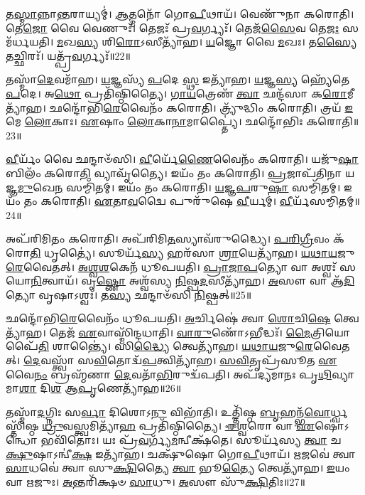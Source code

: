 𑌤\-\ul{𑌸𑍍𑌮𑌾}\-𑌨𑍍𑌨𑌾\-\ul{𑌨𑍍𑌤}\-𑌰𑌾𑌯𑍍𑌯𑌮𑍍॑। 
\-\ul{𑌆}\-𑌤𑍍𑌮𑌨𑍋᳴ 𑌗𑍋\-\ul{𑌪𑍀}\-𑌥𑌾𑌯᳴। 
𑌵𑍇𑌣𑍁᳴𑌨𑌾 𑌕𑌰𑍋𑌤𑌿। 
𑌤𑍇\-\ul{𑌜𑍋} 𑌵𑍈 𑌵𑍇𑌣𑍁𑌃᳴। 
𑌤𑍇𑌜𑌃᳴ 𑌪𑍍𑌰\-\ul{𑌵}\-𑌰𑍍𑌗𑍍𑌯𑌃᳴। 
𑌤𑍇𑌜᳴\-\ul{𑌸𑍈}\-𑌵 𑌤𑍇\-\ul{𑌜𑌃} 𑌸𑌮᳴𑌰𑍍𑌧𑌯𑌤𑌿। 
\-\ul{𑌮}\-𑌖\-\ul{𑌸𑍍𑌯} 𑌶𑌿\-\ul{𑌰𑍋}\-𑌽𑌸𑍀𑌤𑍍𑌯𑌾᳴𑌹। 
\-\ul{𑌯}\-𑌜𑍍𑌞𑍋 𑌵𑍈 \ul{𑌮}\-𑌖𑌃। 
𑌤\-\ul{𑌸𑍍𑌯𑍈}\-𑌤𑌚𑍍𑌛𑌿𑌰𑌃᳴। 
𑌯𑌤𑍍𑌪𑍍𑌰᳴\-\ul{𑌵}\-𑌰𑍍𑌗𑍍𑌯𑌃᳴॥22॥

𑌤𑌸𑍍𑌮𑌾᳴\-\ul{𑌦𑍇}\-𑌵𑌮𑌾᳴𑌹। 
\-\ul{𑌯}\-𑌜𑍍𑌞𑌸𑍍𑌯᳴ \ul{𑌪}\-𑌦𑍇 \ul{𑌸𑍍𑌥} 𑌇𑌤𑍍𑌯𑌾᳴𑌹। 
\-\ul{𑌯}\-𑌜𑍍𑌞\-\ul{𑌸𑍍𑌯} 𑌹𑍍𑌯𑍇᳴𑌤𑍇 \ul{𑌪}\-𑌦𑍇। 
𑌅\-\ul{𑌥𑍋} 𑌪𑍍𑌰𑌤𑌿᳴𑌷𑍍𑌠𑌿𑌤𑍍𑌯𑍈। 
\-\ul{𑌗𑌾}\-\-\ul{𑌯}\-𑌤𑍍𑌰𑍇𑌣᳴ \ul{𑌤𑍍𑌵𑌾} 𑌛𑌨𑍍𑌦᳴𑌸𑌾 𑌕\-\ul{𑌰𑍋}\-𑌮𑍀𑌤𑍍𑌯𑌾᳴𑌹। 
𑌛𑌨𑍍𑌦𑍋᳴𑌭𑌿\-\ul{𑌰𑍇}\-𑌵𑍈𑌨𑌂᳴ 𑌕𑌰𑍋𑌤𑌿। 
𑌤𑍍𑌰𑍍𑌯𑍁᳴𑌦𑍍𑌧𑌿𑌂 𑌕𑌰𑍋𑌤𑌿। 
𑌤𑍍𑌰𑌯᳴ \ul{𑌇}\-𑌮𑍇 \ul{𑌲𑍋}\-𑌕𑌾𑌃। 
\-\ul{𑌏}\-𑌷𑌾𑌂 \ul{𑌲𑍋}\-𑌕𑌾\-\ul{𑌨𑌾}\-𑌮𑌾𑌪𑍍𑌤𑍍𑌯𑍈॑। 
𑌛𑌨𑍍𑌦𑍋᳴𑌭𑌿𑌃 𑌕𑌰𑍋𑌤𑌿॥23॥

\-\ul{𑌵𑍀}\-𑌰𑍍𑌯𑌂᳴ 𑌵𑍈 𑌛𑌨𑍍𑌦𑌾𑍞᳴𑌸𑌿। 
\-\ul{𑌵𑍀}\-𑌰𑍍𑌯𑍇᳴\-\ul{𑌣𑍈}\-𑌵𑍈𑌨𑌂᳴ 𑌕𑌰𑍋𑌤𑌿। 
𑌯𑌜𑍁᳴\-\ul{𑌷𑌾} 𑌬𑌿𑌲𑌂᳴ 𑌕𑌰𑍋\-\ul{𑌤𑌿} 𑌵𑍍𑌯𑌾𑌵𑍃᳴𑌤𑍍𑌯𑍈। 
𑌇𑌯𑌂᳴ 𑌤𑌂 𑌕𑌰𑍋𑌤𑌿। 
\-\ul{𑌪𑍍𑌰}\-𑌜𑌾𑌪᳴𑌤𑌿𑌨𑌾 𑌯𑌜𑍍𑌞\-\ul{𑌮𑍁}\-𑌖𑍇\-\ul{𑌨} 𑌸𑌮𑍍𑌮𑌿᳴𑌤𑌮𑍍। 
𑌇𑌯𑌂᳴ 𑌤𑌂 𑌕𑌰𑍋𑌤𑌿। 
\-\ul{𑌯}\-\-\ul{𑌜𑍍𑌞}\-\-\ul{𑌪}\-𑌰𑍁\-\ul{𑌷𑌾} 𑌸𑌮𑍍𑌮𑌿᳴𑌤𑌮𑍍। 
𑌇𑌯𑌂᳴ 𑌤𑌂 𑌕𑌰𑍋𑌤𑌿। 
\-\ul{𑌏}\-𑌤𑌾\-\ul{𑌵}\-𑌦𑍍𑌵𑍈 𑌪𑍁𑌰𑍁᳴𑌷𑍇 \ul{𑌵𑍀}\-𑌰𑍍𑌯𑌮𑍍॑। 
\-\ul{𑌵𑍀}\-𑌰𑍍𑌯᳴𑌸𑌮𑍍𑌮𑌿𑌤𑌮𑍍॥24॥

𑌅𑌪᳴𑌰𑌿𑌮𑌿𑌤𑌂 𑌕𑌰𑍋𑌤𑌿। 
𑌅𑌪᳴𑌰𑌿𑌮𑌿\-\ul{𑌤}\-𑌸𑍍𑌯𑌾𑌵᳴𑌰𑍁𑌦𑍍𑌧𑍍𑌯𑍈। 
\-\ul{𑌪}\-\-\ul{𑌰𑌿}\-\-\ul{𑌗𑍍𑌰𑍀}\-𑌵𑌂 𑌕᳴𑌰𑍋\-\ul{𑌤𑌿} 𑌧𑍃𑌤𑍍𑌯𑍈॑। 
𑌸𑍂𑌰𑍍𑌯᳴\-\ul{𑌸𑍍𑌯} 𑌹𑌰᳴𑌸𑌾 \ul{𑌶𑍍𑌰𑌾}\-𑌯𑍇𑌤𑍍𑌯𑌾᳴𑌹। 
\-\ul{𑌯}\-\-\ul{𑌥𑌾}\-\-\ul{𑌯}\-𑌜𑍁\-\ul{𑌰𑍇}\-𑌵𑍈𑌤𑌤𑍍। 
\-\ul{𑌅}\-\-\ul{𑌶𑍍𑌵}\-\-\ul{𑌶}\-𑌕𑍇𑌨᳴ 𑌧𑍂𑌪𑌯𑌤𑌿। 
\-\ul{𑌪𑍍𑌰𑌾}\-\-\ul{𑌜𑌾}\-\-\ul{𑌪}\-𑌤𑍍𑌯𑍋 𑌵𑌾 𑌅𑌶𑍍𑌵𑌃᳴ 𑌸𑌯𑍋\-\ul{𑌨𑌿}\-𑌤𑍍𑌵𑌾𑌯᳴। 
𑌵𑍃\-\ul{𑌷𑍍𑌣𑍋} 𑌅𑌶𑍍𑌵᳴𑌸𑍍𑌯 \ul{𑌨𑌿}\-𑌷𑍍𑌪\-\ul{𑌦}\-𑌸𑍀𑌤𑍍𑌯𑌾᳴𑌹। 
\-\ul{𑌅}\-𑌸𑍗 𑌵𑌾 𑌆᳴\-\ul{𑌦𑌿}\-𑌤𑍍𑌯𑍋 𑌵𑍃𑌷𑌾𑌽𑌶𑍍𑌵𑌃᳴। 
𑌤\-\ul{𑌸𑍍𑌯} 𑌛𑌨𑍍𑌦𑌾𑍞᳴𑌸𑌿 \ul{𑌨𑌿}\-𑌷𑍍𑌪𑌤𑍍॥25॥

𑌛𑌨𑍍𑌦𑍋᳴𑌭𑌿\-\ul{𑌰𑍇}\-𑌵𑍈𑌨𑌂᳴ 𑌧𑍂𑌪𑌯𑌤𑌿। 
\-\ul{𑌅}\-𑌰𑍍𑌚𑌿𑌷𑍇॑ 𑌤𑍍𑌵𑌾 \ul{𑌶𑍋}\-𑌚𑌿\-\ul{𑌷𑍇} 𑌤𑍍𑌵𑍇𑌤𑍍𑌯𑌾᳴𑌹। 
𑌤𑍇𑌜᳴ \ul{𑌏}\-𑌵𑌾𑌸𑍍𑌮𑌿᳴𑌨𑍍𑌦𑌧𑌾𑌤𑌿। 
\-\ul{𑌵𑌾}\-\-\ul{𑌰𑍁}\-𑌣𑍋᳴𑌽𑌭𑍀𑌦𑍍𑌧𑌃᳴। 
\-\ul{𑌮𑍈}\-𑌤𑍍𑌰𑌿𑌯𑍋𑌪𑍈᳴\-\ul{𑌤𑌿} 𑌶𑌾𑌨𑍍𑌤𑍍𑌯𑍈॑। 
𑌸𑌿\-\ul{𑌦𑍍𑌧𑍍𑌯𑍈} 𑌤𑍍𑌵𑍇𑌤𑍍𑌯𑌾᳴𑌹। 
\-\ul{𑌯}\-\-\ul{𑌥𑌾}\-\-\ul{𑌯}\-𑌜𑍁\-\ul{𑌰𑍇}\-𑌵𑍈𑌤𑌤𑍍। 
\-\ul{𑌦𑍇}\-𑌵𑌸𑍍𑌤𑍍𑌵𑌾᳴ 𑌸\-\ul{𑌵𑌿}\-𑌤𑍋𑌦𑍍𑌵᳴\-\ul{𑌪}\-𑌤𑍍𑌵𑌿𑌤𑍍𑌯𑌾᳴𑌹। 
\-\ul{𑌸}\-\-\ul{𑌵𑌿}\-𑌤𑍃𑌪𑍍𑌰᳴𑌸𑍂𑌤 \ul{𑌏}\-𑌵𑍈\-\ul{𑌨𑌂} 𑌬𑍍𑌰𑌹𑍍𑌮᳴𑌣𑌾 \ul{𑌦𑍇}\-𑌵𑌤𑌾᳴\-\ul{𑌭𑌿}\-𑌰𑍁𑌦𑍍𑌵᳴𑌪𑌤𑌿। 
𑌅𑌪᳴𑌦𑍍𑌯𑌮𑌾𑌨𑌃 𑌪𑍃\-\ul{𑌥𑌿}\-𑌵𑍍𑌯𑌾𑌮𑌾\-\ul{𑌶𑌾} 𑌦𑌿\-\ul{𑌶} 𑌆\-\ul{𑌪𑍃}\-𑌣𑍇𑌤𑍍𑌯𑌾᳴𑌹॥26॥

𑌤𑌸𑍍𑌮𑌾᳴\-\ul{𑌦}\-𑌗𑍍𑌨𑌿𑌃 𑌸\-\ul{𑌰𑍍𑌵𑌾} 𑌦𑌿𑌶𑍋𑌽\-\ul{𑌨𑍁} 𑌵𑌿𑌭𑌾᳴𑌤𑌿। 
𑌉𑌤𑍍𑌤𑌿᳴𑌷𑍍𑌠 \ul{𑌬𑍃}\-𑌹𑌨𑍍𑌭᳴\-\ul{𑌵𑍋}\-𑌰𑍍𑌧𑍍𑌵𑌸𑍍𑌤𑌿᳴𑌷𑍍𑌠 \ul{𑌧𑍍𑌰𑍁}\-𑌵𑌸𑍍𑌤𑍍𑌵𑌮𑌿𑌤𑍍𑌯𑌾᳴\-\ul{𑌹} 𑌪𑍍𑌰𑌤𑌿᳴𑌷𑍍𑌠𑌿𑌤𑍍𑌯𑍈। 
\-\ul{𑌈}\-\-\ul{𑌶𑍍𑌵}\-𑌰𑍋 𑌵𑌾 \ul{𑌏}\-𑌷𑍋॑𑌽𑌨𑍍𑌧𑍋 𑌭𑌵𑌿᳴𑌤𑍋𑌃। 
𑌯𑌃 𑌪𑍍𑌰᳴\-\ul{𑌵}\-𑌰𑍍𑌗𑍍𑌯᳴\-\ul{𑌮}\-𑌨𑍍𑌵𑍀𑌕𑍍𑌷᳴𑌤𑍇। 
𑌸𑍂𑌰𑍍𑌯᳴𑌸𑍍𑌯 \ul{𑌤𑍍𑌵𑌾} 𑌚\-\ul{𑌕𑍍𑌷𑍁}\-𑌷𑌾𑌽𑌨𑍍𑌵𑍀॑\-\ul{𑌕𑍍𑌷} 𑌇𑌤𑍍𑌯𑌾᳴𑌹। 
𑌚𑌕𑍍𑌷𑍁᳴𑌷𑍋 𑌗𑍋\-\ul{𑌪𑍀}\-𑌥𑌾𑌯᳴। 
\-\ul{𑌋}\-𑌜𑌵𑍇॑ 𑌤𑍍𑌵𑌾 \ul{𑌸𑌾}\-𑌧𑌵𑍇॑ 𑌤𑍍𑌵𑌾 𑌸𑍁\-\ul{𑌕𑍍𑌷𑌿}\-𑌤𑍍𑌯𑍈 \ul{𑌤𑍍𑌵𑌾} 𑌭𑍂\-\ul{𑌤𑍍𑌯𑍈} 𑌤𑍍𑌵𑍇𑌤𑍍𑌯𑌾᳴𑌹। 
\-\ul{𑌇}\-𑌯𑌂 𑌵𑌾 \ul{𑌋}\-𑌜𑍁𑌃। 
\-\ul{𑌅}\-𑌨𑍍𑌤𑌰𑌿᳴𑌕𑍍𑌷𑍞 \ul{𑌸𑌾}\-𑌧𑍁। 
\-\ul{𑌅}\-𑌸𑍗 𑌸𑍁᳴\-\ul{𑌕𑍍𑌷𑌿}\-𑌤𑌿𑌃॥27॥

